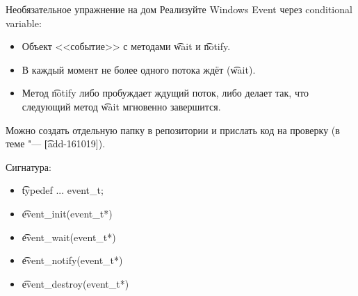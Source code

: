 \begin{frame}{Необязательное упражнение на дом}
	Реализуйте Windows Event через conditional variable:
	\begin{itemize}
		\item Объект <<событие>> с методами \t{wait} и \t{notify}.
		\item В каждый момент не более одного потока ждёт (\t{wait}).
		\item Метод \t{notify} либо пробуждает ждущий поток, либо делает так, что следующий метод \t{wait} мгновенно завершится.
	\end{itemize}
	Можно создать отдельную папку в репозитории и прислать код на проверку (в теме "--- \t{[add-161019]}).

	Сигнатура:
	\begin{itemize}
		\item \t{typedef ... event\_t;}
		\item \t{event\_init(event\_t*)}
		\item \t{event\_wait(event\_t*)}
		\item \t{event\_notify(event\_t*)}
		\item \t{event\_destroy(event\_t*)}
	\end{itemize}
\end{frame}
